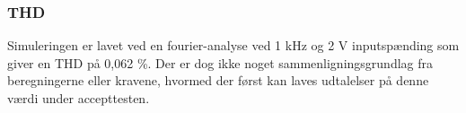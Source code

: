 
\clearpage

\subsubsection*{THD}
Simuleringen er lavet ved en fourier-analyse ved 1 kHz og 2 V inputspænding som giver en THD på 0,062 \%. Der er dog ikke noget sammenligningsgrundlag fra beregningerne eller kravene, hvormed der først kan laves udtalelser på denne værdi under accepttesten. 
